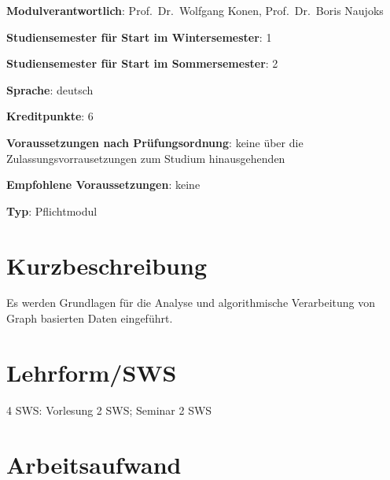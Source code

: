 \begin{modulHead}
\textbf{Modulverantwortlich}: Prof.~Dr.~Wolfgang
Konen, Prof.~Dr.~Boris
Naujoks
\end{modulHead}
\begin{modulHead}
\textbf{Studiensemester für
Start im Wintersemester}:
1
\end{modulHead}
\begin{modulHead}
\textbf{Studiensemester für Start
im Sommersemester}:
2
\end{modulHead}
\begin{modulHead}
\textbf{Sprache}:
deutsch
\end{modulHead}
\begin{modulHead}
\textbf{Kreditpunkte}:
6
\end{modulHead}
\begin{modulHead}
\textbf{Voraussetzungen nach
Prüfungsordnung}: keine über die Zulassungsvorrausetzungen zum Studium
hinausgehenden
\end{modulHead}
\begin{modulHead}
\textbf{Empfohlene
Voraussetzungen}: keine
\end{modulHead}
\begin{modulHead}
\textbf{Typ}:
Pflichtmodul
\end{modulHead}


\section*{Kurzbeschreibung\label{/mi-2017/modulbeschreibungen-master/MA_All_Modul_Mathematik}}\label{kurzbeschreibungpathlabelmi-2017modulbeschreibungen-mastermaux5fallux5fmodulux5fmathematik}

Es werden Grundlagen für die Analyse und algorithmische Verarbeitung von
Graph basierten Daten eingeführt.

\section*{Lehrform/SWS\label{/mi-2017/modulbeschreibungen-master/MA_All_Modul_Mathematik}}\label{lehrformswspathlabelmi-2017modulbeschreibungen-mastermaux5fallux5fmodulux5fmathematik}

4 SWS: Vorlesung 2 SWS; Seminar 2 SWS

\section*{Arbeitsaufwand\label{/mi-2017/modulbeschreibungen-master/MA_All_Modul_Mathematik}}\label{arbeitsaufwandpathlabelmi-2017modulbeschreibungen-mastermaux5fallux5fmodulux5fmathematik}

